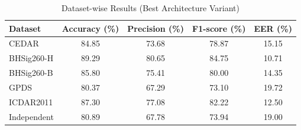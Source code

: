 \begin{table}[htbp]
\caption{Dataset-wise Results (Best Architecture Variant)}
\label{tab:dataset_breakdown}
\begin{center}
\begin{tabular}{|l|c|c|c|c|}
\hline
\textbf{Dataset} & \textbf{Accuracy (\%)} & \textbf{Precision (\%)} & \textbf{F1-score (\%)} & \textbf{EER (\%)} \\
\hline
CEDAR & 84.85 & 73.68 & 78.87 & 15.15 \\
BHSig260-H & 89.29 & 80.65 & 84.75 & 10.71 \\
BHSig260-B & 85.80 & 75.41 & 80.00 & 14.35 \\
GPDS & 80.37 & 67.29 & 73.10 & 19.72 \\
ICDAR2011 & 87.30 & 77.08 & 82.22 & 12.50 \\
Independent & 80.89 & 67.78 & 73.94 & 19.00 \\
\hline
\end{tabular}
\end{center}
\end{table}